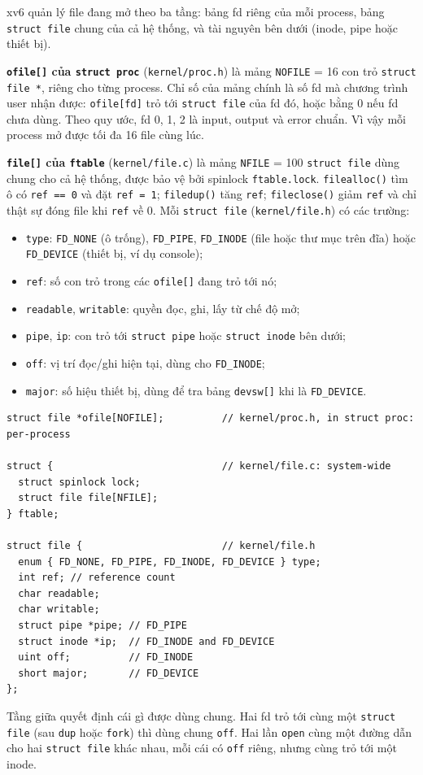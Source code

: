 xv6 quản lý file đang mở theo ba tầng: bảng fd riêng của mỗi process, bảng \texttt{struct file} chung của cả hệ thống, và tài nguyên bên dưới (inode, pipe hoặc thiết bị).

\textbf{\texttt{ofile[]} của \texttt{struct proc}} (\texttt{kernel/proc.h}) là mảng \texttt{NOFILE} = 16 con trỏ \texttt{struct file *}, riêng cho từng process. Chỉ số của mảng chính là số fd mà chương trình user nhận được: \texttt{ofile[fd]} trỏ tới \texttt{struct file} của fd đó, hoặc bằng 0 nếu fd chưa dùng. Theo quy ước, fd 0, 1, 2 là input, output và error chuẩn. Vì vậy mỗi process mở được tối đa 16 file cùng lúc.

\textbf{\texttt{file[]} của \texttt{ftable}} (\texttt{kernel/file.c}) là mảng \texttt{NFILE} = 100 \texttt{struct file} dùng chung cho cả hệ thống, được bảo vệ bởi spinlock \texttt{ftable.lock}. \texttt{filealloc()} tìm ô có \texttt{ref == 0} và đặt \texttt{ref = 1}; \texttt{filedup()} tăng \texttt{ref}; \texttt{fileclose()} giảm \texttt{ref} và chỉ thật sự đóng file khi \texttt{ref} về 0. Mỗi \texttt{struct file} (\texttt{kernel/file.h}) có các trường:
\begin{itemize}
    \item \texttt{type}: \texttt{FD\_NONE} (ô trống), \texttt{FD\_PIPE}, \texttt{FD\_INODE} (file hoặc thư mục trên đĩa) hoặc \texttt{FD\_DEVICE} (thiết bị, ví dụ console);
    \item \texttt{ref}: số con trỏ trong các \texttt{ofile[]} đang trỏ tới nó;
    \item \texttt{readable}, \texttt{writable}: quyền đọc, ghi, lấy từ chế độ mở;
    \item \texttt{pipe}, \texttt{ip}: con trỏ tới \texttt{struct pipe} hoặc \texttt{struct inode} bên dưới;
    \item \texttt{off}: vị trí đọc/ghi hiện tại, dùng cho \texttt{FD\_INODE};
    \item \texttt{major}: số hiệu thiết bị, dùng để tra bảng \texttt{devsw[]} khi là \texttt{FD\_DEVICE}.
\end{itemize}

\begin{lstlisting}[style=xv6code]
struct file *ofile[NOFILE];          // kernel/proc.h, in struct proc: per-process

struct {                             // kernel/file.c: system-wide
  struct spinlock lock;
  struct file file[NFILE];
} ftable;

struct file {                        // kernel/file.h
  enum { FD_NONE, FD_PIPE, FD_INODE, FD_DEVICE } type;
  int ref; // reference count
  char readable;
  char writable;
  struct pipe *pipe; // FD_PIPE
  struct inode *ip;  // FD_INODE and FD_DEVICE
  uint off;          // FD_INODE
  short major;       // FD_DEVICE
};
\end{lstlisting}

Tầng giữa quyết định cái gì được dùng chung. Hai fd trỏ tới cùng một \texttt{struct file} (sau \texttt{dup} hoặc \texttt{fork}) thì dùng chung \texttt{off}. Hai lần \texttt{open} cùng một đường dẫn cho hai \texttt{struct file} khác nhau, mỗi cái có \texttt{off} riêng, nhưng cùng trỏ tới một inode.
